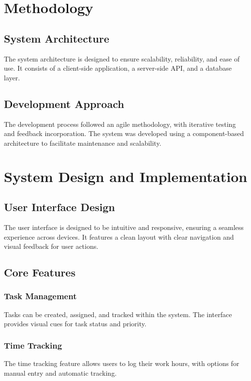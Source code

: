 \documentclass[12pt,a4paper]{article}
\begin{document}
\section{Methodology}
\subsection{System Architecture}
The system architecture is designed to ensure scalability, reliability, and ease of use. It consists of a client-side application, a server-side API, and a database layer.



\subsection{Development Approach}
The development process followed an agile methodology, with iterative testing and feedback incorporation. The system was developed using a component-based architecture to facilitate maintenance and scalability.

\section{System Design and Implementation}
\subsection{User Interface Design}
The user interface is designed to be intuitive and responsive, ensuring a seamless experience across devices. It features a clean layout with clear navigation and visual feedback for user actions.

\subsection{Core Features}
\subsubsection{Task Management}
Tasks can be created, assigned, and tracked within the system. The interface provides visual cues for task status and priority.

\subsubsection{Time Tracking}
The time tracking feature allows users to log their work hours, with options for manual entry and automatic tracking.
\end{document}
